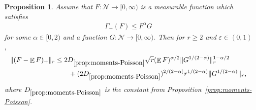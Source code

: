 \documentclass[a4paper]{amsart}
\newtheorem{proposition}[theorem]{Proposition} %
\theoremstyle{definition}
\theoremstyle{remark}
\numberwithin{equation}{section}
\newcommand{\fs}{D_{\ref{prop:moments-Poisson}}}
\DeclareMathOperator{\EE}{\mathbb{E}} %
\begin{document}
\begin{proposition}\label{prop:Poisson-self-bounded}
Assume that $F\colon \mathcal{N}\to [0,\infty)$ is a measurable function which satisfies
\begin{align}\label{eq:self-bounded-assumption}
  \Gamma_+(F) \le F^\alpha G
\end{align}
for some $\alpha \in [0,2)$ and a function $G\colon \mathcal{N} \to [0,\infty)$. Then for $r \ge 2$ and $\varepsilon \in (0,1)$,
\begin{equation}
\label{eq:Poisson-self-bounded}
\begin{split}
  \|(F-\EE F)_+\|_r
  &\le 2\fs\sqrt{r}(\EE F)^{\alpha/2}\|G^{1/(2-\alpha)}\|_r^{1-\alpha/2}  \\
  &\qquad + (2\fs)^{2/(2-\alpha)} r^{1/(2-\alpha)}\|G^{1/(2-\alpha)}\|_r,
\end{split}
\end{equation}
where $\fs$ is the constant from Proposition~\ref{prop:moments-Poisson}.
\end{proposition}
\end{document}
